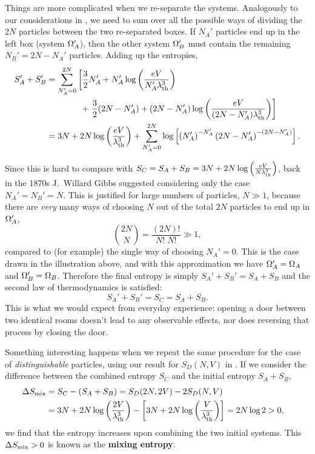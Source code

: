 Things are more complicated when we re-separate the systems.
Analogously to our considerations in , we need to sum over all the possible ways of dividing the $2N$ particles between the two re-separated boxes.
If $N_A'$ particles end up in the left box (system $\Omega_A'$), then the other system $\Omega_B'$ must contain the remaining $N_B' = 2N - N_A'$ particles.
Adding up the entropies,
\begin{align}
  S_A' + S_B' & = \sum_{N_A' = 0}^{2N} \left[\frac{3}{2} N_A' + N_A' \log\left(\frac{eV}{N_A' \lambda_{\mathrm{th}}^3}\right) \right. \cr
              &         \qquad\qquad + \left.\frac{3}{2} (2N - N_A') + (2N - N_A') \log\left(\frac{eV}{(2N - N_A') \lambda_{\mathrm{th}}^3}\right)\right] \label{eq:mixing_full} \\
              & = 3N + 2N \log\left(\frac{eV}{\lambda_{\mathrm{th}}^3}\right) + \sum_{N_A' = 0}^{2N} \log\left[\left(N_A'\right)^{-N_A'} \left(2N - N_A'\right)^{-(2N - N_A')}\right]. \nonumber
\end{align}

Since this is hard to compare with $S_C = S_A + S_B = 3N + 2N \log\left(\frac{eV}{N\lambda_{\mathrm{th}}^3}\right)$, back in the 1870s J.\ Willard Gibbs suggested considering only the case $N_A' = N_B' = N$.
This is justified for large numbers of particles, $N \gg 1$, because there are \textit{very} many ways of choosing $N$ out of the total $2N$ particles to end up in $\Omega_A'$,
\begin{equation}
  \label{eq:mixing_factorial}
  \binom{2N}{N} = \frac{(2N)!}{N! \; N!} \gg 1,
\end{equation}
compared to (for example) the single way of choosing $N_A' = 0$.
This is the case drawn in the illustration above, and with this approximation we have $\Omega_A' = \Omega_A$ and $\Omega_B' = \Omega_B$.
Therefore the final entropy is simply $S_A' + S_B' = S_A + S_B$ and the second law of thermodynamics is satisfied:
\begin{equation*}
  S_A' + S_B' = S_C = S_A + S_B.
\end{equation*}
This is what we would expect from everyday experience: opening a door between two identical rooms doesn't lead to any observable effects, nor does reversing that process by closing the door.

Something interesting happens when we repeat the same procedure for the case of \textit{distinguishable} particles, using our result for $S_D(N, V)$ in .
If we consider the difference between the combined entropy $S_C$ and the initial entropy $S_A + S_B$,
\begin{align}
  \Delta S_{\mathrm{mix}} & = S_C - (S_A + S_B) = S_D(2N, 2V) - 2S_D(N, V) \cr
                       & = 3N + 2N \log\left(\frac{2V}{\lambda_{\mathrm{th}}^3}\right) - \left[3N + 2N \log\left(\frac{V}{\lambda_{\mathrm{th}}^3}\right)\right] = 2N\log 2 > 0, \label{eq:mixing_entropy}
\end{align}
we find that the entropy increases upon combining the two initial systems.
This $\Delta S_{\mathrm{mix}} > 0$ is known as the \textbf{mixing entropy}.

